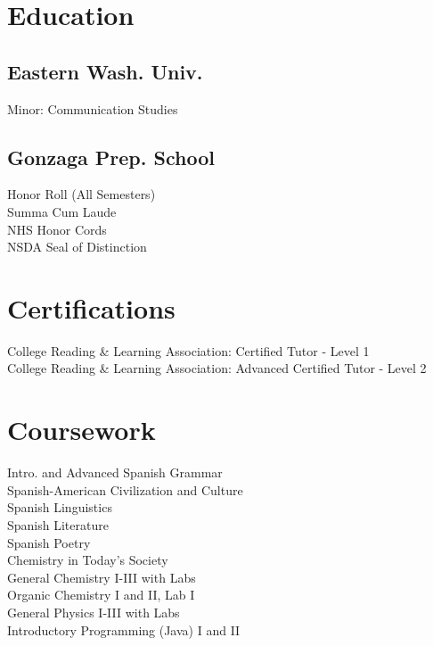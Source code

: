 \documentclass[]{deedy-resume-openfont}
\begin{document}
\begin{minipage}[t]{0.24\textwidth} 


\section{Education} 

\subsection{Eastern Wash. Univ.}
\textbullet Minor: Communication Studies
\sectionsep

\subsection{Gonzaga Prep. School}
\textbullet Honor Roll (All Semesters) \\
\textbullet Summa Cum Laude\\ 
\textbullet NHS Honor Cords\\
\textbullet NSDA Seal of Distinction
\sectionsep



\section{Certifications}
\textbullet College Reading \& Learning Association: Certified Tutor - Level 1\\
\textbullet College Reading \& Learning Association: Advanced Certified Tutor - Level 2\\
%

\section{Coursework}
\textbullet Intro. and Advanced Spanish Grammar \\
\textbullet Spanish-American Civilization and Culture \\
\textbullet Spanish Linguistics \\
\textbullet Spanish Literature \\
\textbullet Spanish Poetry\\
\textbullet Chemistry in Today's Society\\
\textbullet General Chemistry I-III with Labs \\
\textbullet Organic Chemistry I and II, Lab I \\
\textbullet General Physics I-III with Labs \\
\textbullet Introductory Programming (Java) I and II


\end{minipage}
\end{document}
